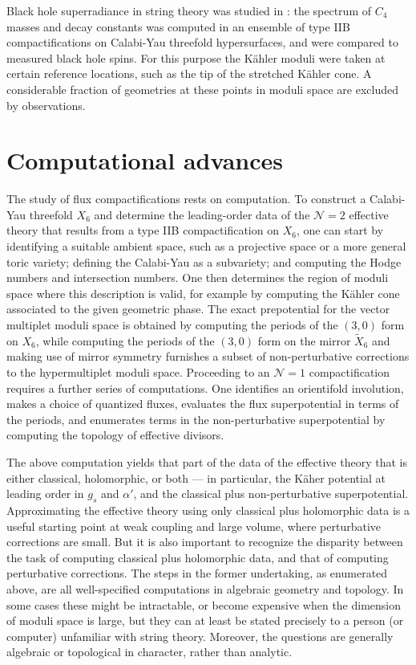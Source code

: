 \documentclass[12pt,a4wide]{article}
\begin{document}
Black hole superradiance in string theory was studied in \cite{Mehta:2021pwf}: the spectrum of $C_4$ masses and decay constants was computed in an ensemble of type IIB compactifications on Calabi-Yau threefold hypersurfaces, and were compared to measured black hole spins.  For this purpose the K\"ahler moduli were taken at certain reference locations, such as the tip of the stretched K\"ahler cone.  A considerable fraction of geometries at these points in moduli space are excluded by observations.




\section{Computational advances}\label{sec:computation}
 

The study of flux compactifications rests on computation. 
To construct a Calabi-Yau threefold $X_6$ and determine
the leading-order data of the $\mathcal{N}=2$ effective theory that results from a type IIB compactification on $X_6$, one can start by identifying a suitable ambient space, such as a projective space or a more general toric variety; defining the Calabi-Yau as a subvariety; and computing the Hodge numbers and intersection numbers.  One then determines the region of moduli space where this description is valid, for example by computing the K\"ahler cone associated to the given geometric phase.
The exact prepotential for the vector multiplet moduli space is obtained by computing the periods of the $(3,0)$ form on $X_6$, while computing the periods of the $(3,0)$ form on the mirror $\widetilde{X}_6$ and making use of mirror symmetry furnishes a subset of non-perturbative corrections to the hypermultiplet moduli space.  
Proceeding to an $\mathcal{N}=1$ compactification requires a further series of computations.  One identifies an orientifold involution, makes a choice of quantized fluxes, evaluates the flux superpotential in terms of the periods, 
and enumerates terms in the non-perturbative superpotential by computing the topology of effective divisors.  

The above computation yields
that part of the data of the effective theory 
that 
is either classical, holomorphic, or both
--- in particular, the K\"aher potential at leading order in $g_s$ and $\alpha'$, and the classical plus non-perturbative superpotential.  
Approximating the effective theory using only classical plus holomorphic data is a useful 
starting point at weak coupling and large volume, where perturbative corrections are small.
But it is also important to recognize the disparity between the task of computing classical plus holomorphic data, and that of computing perturbative corrections.
The steps in the former undertaking, as enumerated above, are all well-specified computations in algebraic geometry and topology.  In some cases these might be intractable, or become expensive when the dimension of moduli space is large, but they can at least be stated precisely to a person (or computer) unfamiliar with string theory.  Moreover, the questions are generally algebraic or topological in character, rather than analytic.
\end{document}
